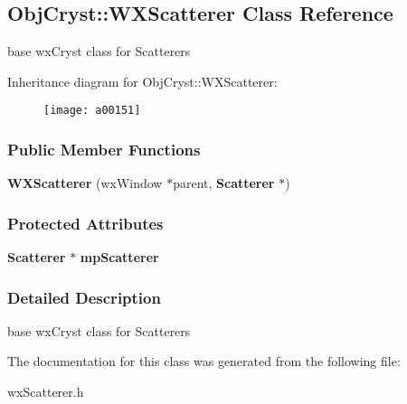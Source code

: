 \subsection{Obj\-Cryst\-:\-:W\-X\-Scatterer Class Reference}
\label{a00151}


base wx\-Cryst class for Scatterers  


Inheritance diagram for Obj\-Cryst\-:\-:W\-X\-Scatterer\-:\begin{figure}[H]
\begin{center}
\leavevmode
\texttt{[image: a00151]}
\end{center}
\end{figure}
\subsubsection*{Public Member Functions}
\begin{DoxyCompactItemize}
\item 
{\bfseries W\-X\-Scatterer} (wx\-Window $\ast$parent, {\bf Scatterer} $\ast$)\label{a00151_a43a37c79f9dca837a55fe024a06fddd6}

\end{DoxyCompactItemize}
\subsubsection*{Protected Attributes}
\begin{DoxyCompactItemize}
\item 
{\bf Scatterer} $\ast$ {\bfseries mp\-Scatterer}\label{a00151_a60b8f362b1735a8942e2991994d5c862}

\end{DoxyCompactItemize}


\subsubsection{Detailed Description}
base wx\-Cryst class for Scatterers 

The documentation for this class was generated from the following file\-:\begin{DoxyCompactItemize}
\item 
wx\-Scatterer.\-h\end{DoxyCompactItemize}
